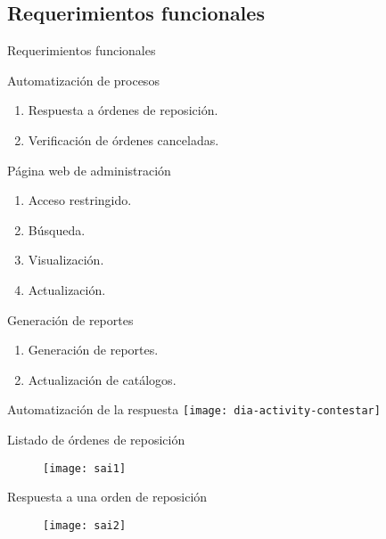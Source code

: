 \subsection{Requerimientos funcionales}
	\begin{frame}{Requerimientos funcionales}
		\begin{block}{Automatización de procesos}
			\begin{enumerate}
				\item Respuesta a órdenes de reposición.
				\item Verificación de órdenes canceladas.
			\end{enumerate}
		\end{block}
		\begin{block}{Página web de administración}
			\begin{multicols}{2}
				\begin{enumerate}
					\item Acceso restringido.
					\item Búsqueda.
					\item Visualización.
					\item Actualización.
				\end{enumerate}
			\end{multicols}
		\end{block}
		\begin{block}{Generación de reportes}
			\begin{enumerate}
				\item Generación de reportes.
				\item Actualización de catálogos.
			\end{enumerate}
		\end{block}
	\end{frame}
	\begin{frame}{Automatización de la respuesta}
		\centering
		\texttt{[image: dia-activity-contestar]}
	\end{frame}
	\begin{frame}{Listado de órdenes de reposición}
		\begin{figure}[H]
		\centering
		\texttt{[image: sai1]}
		\label{fig:sai1}
		\end{figure}
	\end{frame}
	\begin{frame}{Respuesta a una orden de reposición}
		\begin{figure}[H]
		\centering
		\texttt{[image: sai2]}
		\label{fig:sai2}
		\end{figure}
	\end{frame}
